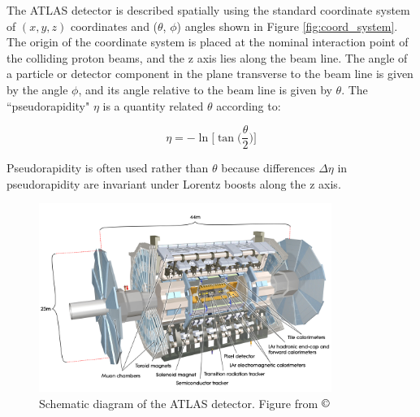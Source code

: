 The ATLAS detector is described spatially using the standard coordinate system of $(x,y,z)$ coordinates and ($\theta$, $\phi$) angles shown in Figure \ref{fig:coord_system}. The origin of the coordinate system is placed at the nominal interaction point of the colliding proton beams, and the z axis lies along the beam line. The angle of a particle or detector component in the plane transverse to the beam line is given by the angle $\phi$, and its angle relative to the beam line is given by $\theta$. The ``pseudorapidity" $\eta$ is a quantity related $\theta$ according to:

\begin{equation}
\label{eq:pseudorapidity}
\eta=-\ln\Big[\tan\Big(\frac{\theta}{2}\Big)\Big]
\end{equation}

Pseudorapidity is often used rather than $\theta$ because differences $\Delta\eta$ in pseudorapidity are invariant under Lorentz boosts along the z axis.

\begin{figure}[H]
	\centering
	\includegraphics[width=0.85\textwidth]{Figures/3/detector.jpg}
	\caption[]{Schematic diagram of the ATLAS detector. Figure from $\copyright$ \cite{atlas}}
	\label{fig:detector}
\end{figure}


